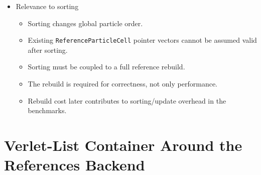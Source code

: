 \begin{itemize}
    \item Relevance to sorting
    \begin{itemize}
        \item Sorting changes global particle order.
        \item Existing \texttt{ReferenceParticleCell} pointer vectors cannot be assumed valid after sorting.
        \item Sorting must be coupled to a full reference rebuild.
        \item The rebuild is required for correctness, not only performance.
        \item Rebuild cost later contributes to sorting/update overhead in the benchmarks.
    \end{itemize}
\end{itemize}

\section{Verlet-List Container Around the References Backend}
\label{sec:baseline_verletlists_references}

